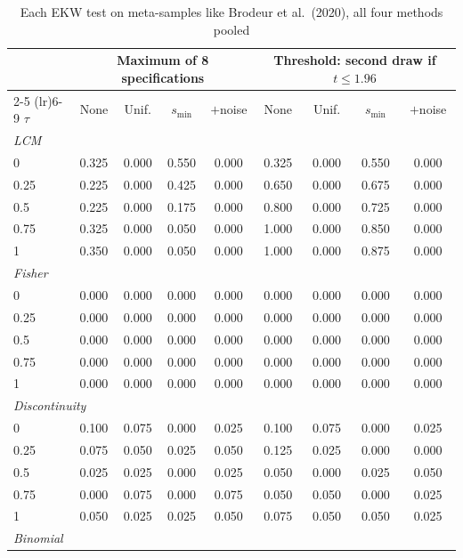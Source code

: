 \begin{table}[htbp]
\centering
\caption{Each EKW test on meta-samples like Brodeur et al.\ (2020), all four methods pooled}
\label{tab:brodeur_all_power_EKW}
\footnotesize
\setlength{\tabcolsep}{4pt}
\begin{tabular}{lcccccccc}
\toprule
 & \multicolumn{4}{c}{Maximum of 8 specifications} & \multicolumn{4}{c}{Threshold: second draw if $t \le 1.96$} \\
\cmidrule(lr){2-5} \cmidrule(lr){6-9}
$\tau$ & None & Unif. & $s_{\min}$ & $+$noise & None & Unif. & $s_{\min}$ & $+$noise \\
\midrule
\multicolumn{9}{l}{\textit{LCM}} \\
0 & 0.325 & 0.000 & 0.550 & 0.000 & 0.325 & 0.000 & 0.550 & 0.000 \\
0.25 & 0.225 & 0.000 & 0.425 & 0.000 & 0.650 & 0.000 & 0.675 & 0.000 \\
0.5 & 0.225 & 0.000 & 0.175 & 0.000 & 0.800 & 0.000 & 0.725 & 0.000 \\
0.75 & 0.325 & 0.000 & 0.050 & 0.000 & 1.000 & 0.000 & 0.850 & 0.000 \\
1 & 0.350 & 0.000 & 0.050 & 0.000 & 1.000 & 0.000 & 0.875 & 0.000 \\
\midrule
\multicolumn{9}{l}{\textit{Fisher}} \\
0 & 0.000 & 0.000 & 0.000 & 0.000 & 0.000 & 0.000 & 0.000 & 0.000 \\
0.25 & 0.000 & 0.000 & 0.000 & 0.000 & 0.000 & 0.000 & 0.000 & 0.000 \\
0.5 & 0.000 & 0.000 & 0.000 & 0.000 & 0.000 & 0.000 & 0.000 & 0.000 \\
0.75 & 0.000 & 0.000 & 0.000 & 0.000 & 0.000 & 0.000 & 0.000 & 0.000 \\
1 & 0.000 & 0.000 & 0.000 & 0.000 & 0.000 & 0.000 & 0.000 & 0.000 \\
\midrule
\multicolumn{9}{l}{\textit{Discontinuity}} \\
0 & 0.100 & 0.075 & 0.000 & 0.025 & 0.100 & 0.075 & 0.000 & 0.025 \\
0.25 & 0.075 & 0.050 & 0.025 & 0.050 & 0.125 & 0.025 & 0.000 & 0.000 \\
0.5 & 0.025 & 0.025 & 0.000 & 0.025 & 0.050 & 0.000 & 0.025 & 0.050 \\
0.75 & 0.000 & 0.075 & 0.000 & 0.075 & 0.050 & 0.050 & 0.000 & 0.025 \\
1 & 0.050 & 0.025 & 0.025 & 0.050 & 0.075 & 0.050 & 0.050 & 0.025 \\
\midrule
\multicolumn{9}{l}{\textit{Binomial}} \\

\end{tabular}
\end{table}
